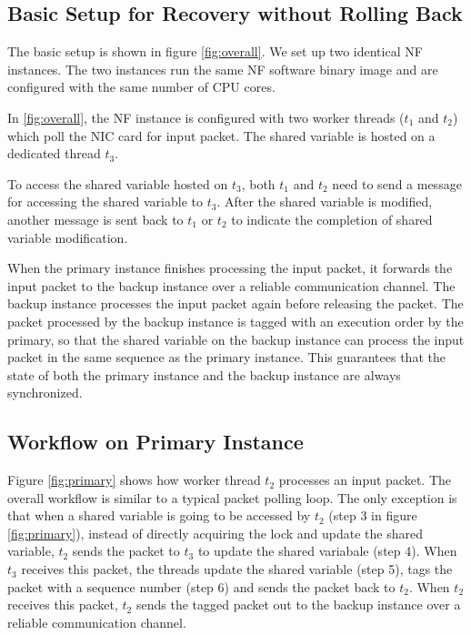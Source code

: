 \subsection{Basic Setup for Recovery without Rolling Back}

The basic setup is shown in figure \ref{fig:overall}. We set up two identical NF
instances. The two instances run the same NF software binary image and are
configured with the same number of CPU cores.

In \ref{fig:overall}, the NF instance is configured with two worker threads
($t_1$ and $t_2$) which poll the NIC card for input packet. The shared variable
is hosted on a dedicated thread $t_3$.

To access the shared variable hosted on $t_3$, both $t_1$ and $t_2$ need to send
a message for accessing the shared variable to $t_3$. After the shared variable
is modified, another message is sent back to $t_1$ or $t_2$ to indicate the
completion of shared variable modification.

When the primary instance finishes processing the input packet, it forwards the
input packet to the backup instance over a reliable communication channel. The
backup instance processes the input packet again before releasing the
packet. The packet processed by the backup instance is tagged with an execution
order by the primary, so that the shared variable on the backup instance can
process the input packet in the same sequence as the primary instance. This
guarantees that the state of both the primary instance and the backup instance
are always synchronized.

\subsection{Workflow on Primary Instance}

Figure \ref{fig:primary} shows how worker thread $t_2$ processes an input
packet. The overall workflow is similar to a typical packet polling loop. The
only exception is that when a shared variable is going to be accessed by $t_2$
(step 3 in figure \ref{fig:primary}), instead of directly acquiring the lock and
update the shared variable, $t_2$ sends the packet to $t_3$ to update the shared
variabale (step 4). When $t_3$ receives this packet, the threads update the
shared variable (step 5), tags the packet with a sequence number (step 6) and
sends the packet back to $t_2$. When $t_2$ receives this packet, $t_2$ sends the
tagged packet out to the backup instance over a reliable communication channel.

